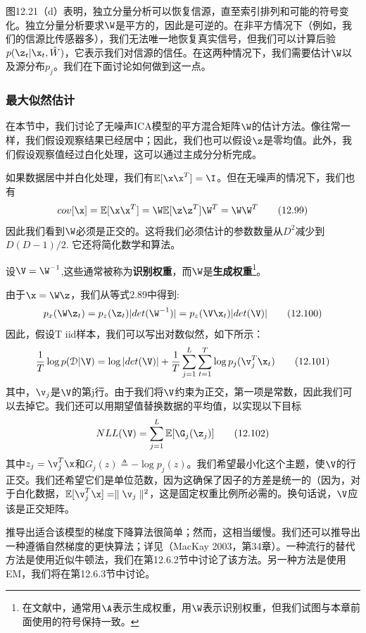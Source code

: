 \documentclass[a4paper]{article}
\begin{document}
图12.21（d）表明，独立分量分析可以恢复信源，直至索引排列和可能的符号变化。独立分量分析要求$\W$是平方的，因此是可逆的。在非平方情况下（例如，我们的信源比传感器多），我们无法唯一地恢复真实信号，但我们可以计算后验$p(\z_t|\x_t,\hat{W})$，它表示我们对信源的信任。在这两种情况下，我们需要估计$\W$以及源分布$p_j$。我们在下面讨论如何做到这一点。 

\subsubsection{最大似然估计 }
在本节中，我们讨论了无噪声ICA模型的平方混合矩阵$\W$的估计方法。像往常一样，我们假设观察结果已经居中；因此，我们也可以假设$\z$是零均值。此外，我们假设观察值经过白化处理，这可以通过主成分分析完成。 

如果数据居中并白化处理，我们有$\mathbb{E}[\x\x^T]=\I$。但在无噪声的情况下，我们也有 
\begin{equation}
	cov[\x]=\mathbb{E}[\x\x^T]=\W\mathbb{E}[\z\z^T]\W^T=\W\W^T\tag{12.99}
\end{equation}
因此我们看到$\W$必须是正交的。这将我们必须估计的参数数量从$D^2$减少到$D(D-1)/2$. 它还将简化数学和算法。 

设$\V=\W^{-1}$,这些通常被称为\textbf{识别权重}，而$\W$是\textbf{生成权重}\footnote{在文献中，通常用$\A$表示生成权重，用$\W$表示识别权重，但我们试图与本章前面使用的符号保持一致。 }。 

由于$\x=\W\z$，我们从等式2.89中得到:
\begin{equation}
	p_x(\W\z_t)=p_z(\z_t)|det(\W^{-1})|=p_z(\V\x_t)|det(\V)|\tag{12.100}
\end{equation}
因此，假设T iid样本，我们可以写出对数似然，如下所示： 
\begin{equation}
	\frac{1}{T}\log p(\mathcal{D}|\V)=\log |det(\V)|+\frac{1}{T}\sum_{j=1}^{L}\sum_{t=1}^{T}\log p_j(\v_j^T\x_t)\tag{12.101}
\end{equation}
其中，$\v_j$是$\V$的第j行。由于我们将$\V$约束为正交，第一项是常数，因此我们可以去掉它。我们还可以用期望值替换数据的平均值，以实现以下目标 
\begin{equation}
	NLL(\V)=\sum_{j=1}^{L}\mathbb{E}[\G_j(\z_j)]\tag{12.102}
\end{equation}
其中$z_j=\v_j^T\x$和$G_j(z)\triangleq
-\log p_j(z)$。我们希望最小化这个主题，使$\V$的行正交。我们还希望它们是单位范数，因为这确保了因子的方差是统一的（因为，对于白化数据，$\mathbb{E}[\v_j^T\x]=\parallel\v_j \parallel^2$，这是固定权重比例所必需的。换句话说，$\V$应该是正交矩阵。 

推导出适合该模型的梯度下降算法很简单；然而，这相当缓慢。我们还可以推导出一种遵循自然梯度的更快算法；详见（MacKay 2003，第34章）。一种流行的替代方法是使用近似牛顿法，我们在第12.6.2节中讨论了该方法。另一种方法是使用EM，我们将在第12.6.3节中讨论。 
\end{document}
